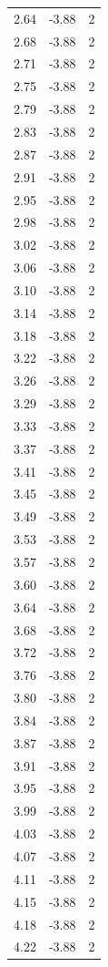 \begin{longtable}{lrr}
  2.64 & -3.88 & 2 \\
  2.68 & -3.88 & 2 \\
  2.71 & -3.88 & 2 \\
  2.75 & -3.88 & 2 \\
  2.79 & -3.88 & 2 \\
  2.83 & -3.88 & 2 \\
  2.87 & -3.88 & 2 \\
  2.91 & -3.88 & 2 \\
  2.95 & -3.88 & 2 \\
  2.98 & -3.88 & 2 \\
  3.02 & -3.88 & 2 \\
  3.06 & -3.88 & 2 \\
  3.10 & -3.88 & 2 \\
  3.14 & -3.88 & 2 \\
  3.18 & -3.88 & 2 \\
  3.22 & -3.88 & 2 \\
  3.26 & -3.88 & 2 \\
  3.29 & -3.88 & 2 \\
  3.33 & -3.88 & 2 \\
  3.37 & -3.88 & 2 \\
  3.41 & -3.88 & 2 \\
  3.45 & -3.88 & 2 \\
  3.49 & -3.88 & 2 \\
  3.53 & -3.88 & 2 \\
  3.57 & -3.88 & 2 \\
  3.60 & -3.88 & 2 \\
  3.64 & -3.88 & 2 \\
  3.68 & -3.88 & 2 \\
  3.72 & -3.88 & 2 \\
  3.76 & -3.88 & 2 \\
  3.80 & -3.88 & 2 \\
  3.84 & -3.88 & 2 \\
  3.87 & -3.88 & 2 \\
  3.91 & -3.88 & 2 \\
  3.95 & -3.88 & 2 \\
  3.99 & -3.88 & 2 \\
  4.03 & -3.88 & 2 \\
  4.07 & -3.88 & 2 \\
  4.11 & -3.88 & 2 \\
  4.15 & -3.88 & 2 \\
  4.18 & -3.88 & 2 \\
  4.22 & -3.88 & 2 \\

\end{longtable}
